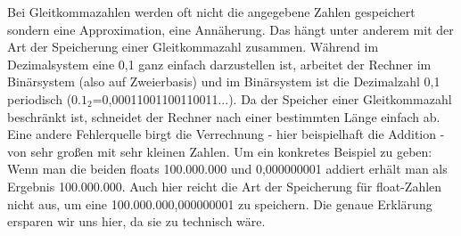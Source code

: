 Bei Gleitkommazahlen werden oft nicht die angegebene Zahlen gespeichert sondern eine Approximation, eine Annäherung. Das hängt unter anderem mit der Art der Speicherung einer Gleitkommazahl zusammen. Während im Dezimalsystem eine 0,1 ganz einfach darzustellen ist, arbeitet der Rechner im Binärsystem (also auf Zweierbasis) und im Binärsystem ist die Dezimalzahl 0,1 periodisch ($0.1_2$=0,00011001100110011...). Da der Speicher einer Gleitkommazahl beschränkt ist, schneidet der Rechner nach einer bestimmten Länge einfach ab.
\\Eine andere Fehlerquelle birgt die Verrechnung - hier beispielhaft die Addition - von sehr großen mit sehr kleinen Zahlen. Um ein konkretes Beispiel zu geben: Wenn man die beiden floats 100.000.000 und 0,000000001 addiert erhält man als Ergebnis 100.000.000. Auch hier reicht die Art der Speicherung für float-Zahlen nicht aus, um eine 100.000.000,000000001 zu speichern. Die genaue Erklärung ersparen wir uns hier, da sie zu technisch wäre.
